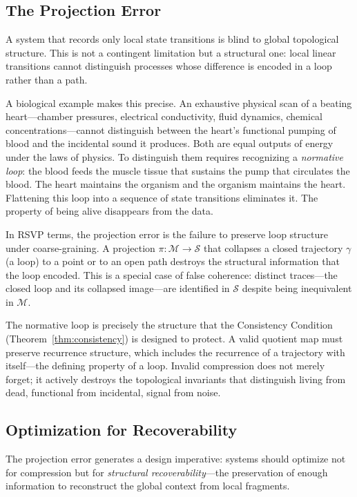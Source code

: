 \documentclass[12pt,a4paper]{article}
\begin{document}
\subsection{The Projection Error}

A system that records only local state transitions is blind to global topological structure. This is not a contingent limitation but a structural one: local linear transitions cannot distinguish processes whose difference is encoded in a loop rather than a path.

A biological example makes this precise. An exhaustive physical scan of a beating heart---chamber pressures, electrical conductivity, fluid dynamics, chemical concentrations---cannot distinguish between the heart's functional pumping of blood and the incidental sound it produces. Both are equal outputs of energy under the laws of physics. To distinguish them requires recognizing a \emph{normative loop}: the blood feeds the muscle tissue that sustains the pump that circulates the blood. The heart maintains the organism and the organism maintains the heart. Flattening this loop into a sequence of state transitions eliminates it. The property of being alive disappears from the data.

In RSVP terms, the projection error is the failure to preserve loop structure under coarse-graining. A projection $\pi : \mathcal{M} \to \mathcal{S}$ that collapses a closed trajectory $\gamma$ (a loop) to a point or to an open path destroys the structural information that the loop encoded. This is a special case of false coherence: distinct traces---the closed loop and its collapsed image---are identified in $\mathcal{S}$ despite being inequivalent in $\mathcal{M}$.

The normative loop is precisely the structure that the Consistency Condition (Theorem~\ref{thm:consistency}) is designed to protect. A valid quotient map must preserve recurrence structure, which includes the recurrence of a trajectory with itself---the defining property of a loop. Invalid compression does not merely forget; it actively destroys the topological invariants that distinguish living from dead, functional from incidental, signal from noise.

\subsection{Optimization for Recoverability}

The projection error generates a design imperative: systems should optimize not for compression but for \emph{structural recoverability}---the preservation of enough information to reconstruct the global context from local fragments.
\end{document}
